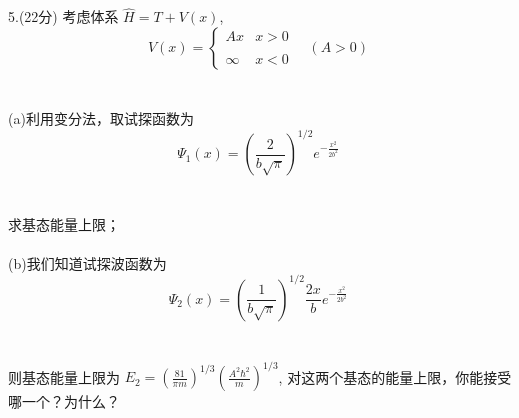 5.(22分) 考虑体系 $\hat{H} = T + V(x)$,
  $$ V(x) = \begin{cases}     A x & x > 0 \\\\     \infty & x < 0     \end{cases} \quad (A > 0)~$$\\\\
 (a)利用变分法，取试探函数为
  $$\Psi_1(x) = \left( \frac{2}{b\sqrt{\pi}} \right)^{1/2} e^{-\frac{x^2}{2b^2}}~$$\\\\
求基态能量上限；\\\\
 (b)我们知道试探波函数为
$$\Psi_2(x) = \left( \frac{1}{b\sqrt{\pi}} \right)^{1/2} \frac{2x}{b} e^{-\frac{x^2}{2b^2}} ~$$\\\\
则基态能量上限为 $E_2 =  \left(\frac{81}{\pi m}\right)^{1/3} \left(\frac{A^2 \hbar^2}{m} \right)^{1/3}$, 对这两个基态的能量上限，你能接受哪一个？为什么？

